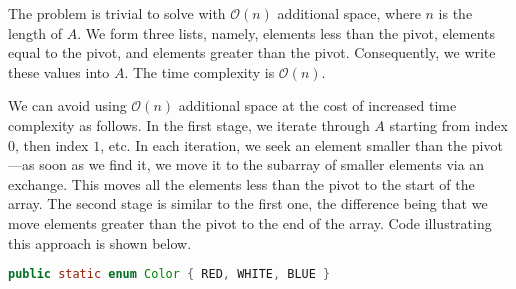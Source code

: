 \documentclass[10pt,openany,twoside,letterpaper,extrafontsizes]{memoir}
\newif\ifCpp
\newif\ifJava
\begin{document}
\begin{Spacing}{\arraysSpacing}

\label{solution-dnf}
The problem is trivial to solve with $\mathcal{O}(n)$ additional space, where $n$ is the length of $A$.
We form three lists, namely, elements less than the pivot, elements equal to the pivot, and elements greater than the pivot.
Consequently, we write these values into $A$.
The time complexity is $\mathcal{O}(n)$.

We can avoid using $\mathcal{O}(n)$ additional space at the cost of increased time complexity as follows.
In the first stage, we iterate through $A$ starting from index $0$, then index $1$, etc.
In each iteration, we seek an element smaller than the pivot---as soon as we find it, we move it to the subarray of smaller elements via an exchange.
This moves all the elements less than the pivot to the start of the array. The second stage is similar to the first one, the difference being that we move elements greater than the pivot to the end of the array.
Code illustrating this approach is shown below.
\ifCpp
\begin{lstlisting}[language={[11]C++}]
typedef enum { RED, WHITE, BLUE } Color;

void DutchFlagPartition(int pivot_index, vector<Color>* A_ptr) {
  vector<Color>& A = *A_ptr;
  Color pivot = A[pivot_index];
  // First pass: group elements smaller than pivot.
  for (int i = 0; i < A.size(); ++i) {
    // Look for a smaller element.
    for (int j = i + 1; j < A.size(); ++j) {
      if (A[j] < pivot) {
        swap(A[i], A[j]);
        break;
      }
    }
  }
  // Second pass: group elements larger than pivot.
  for (int i = A.size() - 1; i >= 0 && A[i] >= pivot; --i) {
    // Look for a larger element. Stop when we reach an element less
    // than pivot, since first pass has moved them to the start of A.
    for (int j = i - 1; j >= 0 && A[j] >= pivot; --j) {
      if (A[j] > pivot) {
        swap(A[i], A[j]);
        break;
      }
    }
  }
}
\end{lstlisting}
\fi%
\ifJava
\begin{lstlisting}[language=Java]
public static enum Color { RED, WHITE, BLUE }


\end{lstlisting}
\end{Spacing}
\end{document}
